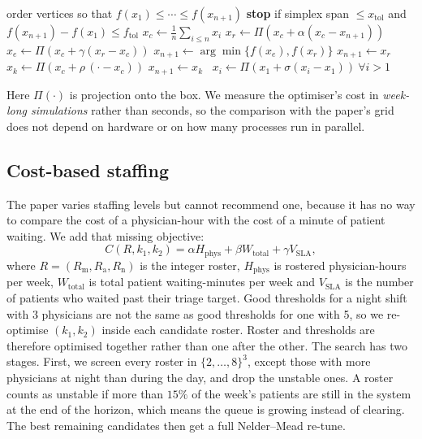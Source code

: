 \documentclass[sigconf,nonacm]{acmart}
\begin{document}
\begin{algorithm}[t]
\caption{Nelder--Mead iteration (minimisation)}
\label{alg:nm}
\begin{algorithmic}[1]
\State order vertices so that $f(x_1)\le\cdots\le f(x_{n+1})$
\State \textbf{stop} if simplex span $\le x_{\text{tol}}$ and
       $f(x_{n+1})-f(x_1)\le f_{\text{tol}}$
\State $x_c \gets \frac{1}{n}\sum_{i\le n} x_i$ 
\State $x_r \gets \Pi\!\left(x_c + \alpha (x_c - x_{n+1})\right)$ 
  \State $x_e \gets \Pi\!\left(x_c + \gamma (x_r - x_c)\right)$ 
  \State $x_{n+1} \gets \arg\min\{f(x_e),f(x_r)\}$
  \State $x_{n+1} \gets x_r$
\Else
  \State $x_k \gets \Pi\!\left(x_c + \rho\,(\cdot - x_c)\right)$ 
   $x_{n+1} \gets x_k$
  \Else\ $x_i \gets \Pi\!\left(x_1 + \sigma (x_i - x_1)\right)\ \forall i>1$
  \EndIf
\EndIf
\end{algorithmic}
\end{algorithm}

Here $\Pi(\cdot)$ is projection onto the box. We measure the optimiser's cost
in \emph{week-long simulations} rather than seconds, so the comparison with the
paper's grid does not depend on hardware or on how many processes run in
parallel.

\subsection{Cost-based staffing}
\label{sec:cost}
The paper varies staffing levels but cannot recommend one, because it has no
way to compare the cost of a physician-hour with the cost of a minute of
patient waiting. We add that missing objective:
\begin{equation}
C(R,k_1,k_2) = \alpha H_{\text{phys}} + \beta W_{\text{total}}
             + \gamma V_{\text{SLA}} ,
\label{eq:cost}
\end{equation}
where $R=(R_{\text{m}},R_{\text{a}},R_{\text{n}})$ is the integer roster,
$H_{\text{phys}}$ is rostered physician-hours per week, $W_{\text{total}}$ is
total patient waiting-minutes per week and $V_{\text{SLA}}$ is the number of
patients who waited past their triage target. Good thresholds for a night
shift with 3 physicians are not the same as good thresholds for one with 5, so
we re-optimise $(k_1,k_2)$ inside each candidate roster. Roster and thresholds
are therefore optimised together rather than one after the other. The search
has two stages. First, we screen every roster in $\{2,\dots,8\}^3$, except those
with more physicians at night than during the day, and drop the unstable ones.
A roster counts as unstable if more than $15\%$ of the week's patients are
still in the system at the end of the horizon, which means the queue is
growing instead of clearing. The best remaining candidates then get a full
Nelder--Mead re-tune.
\end{document}
